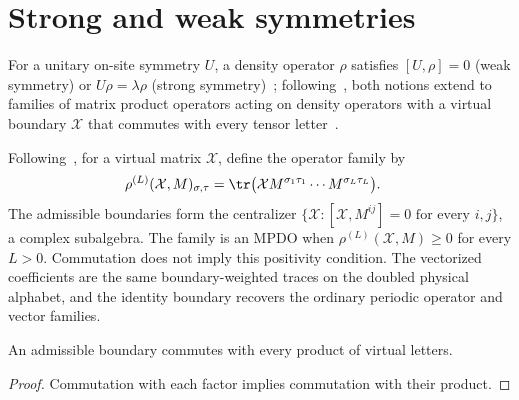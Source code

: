 \section{Strong and weak symmetries}

For a unitary on-site symmetry $U$, a density operator $\rho$ satisfies
$[U,\rho]=0$ (weak symmetry) or $U\rho=\lambda\rho$ (strong
symmetry)~\cite{deGroot2022SPTOpen,GarreRubio2026LocalCharacterization};
following~\cite{Sun2025Anomalous}, both notions extend to families of matrix
product operators acting on density operators with a virtual boundary
$\mathcal X$ that commutes with every tensor letter~\cite{Sun2025Anomalous}.

\begin{definition}
    \label{def:mpdo_commuting_boundary}
    \leanok
    Following~\cite[lines~175--182]{Sun2025Anomalous}, for a virtual matrix
    $\mathcal X$, define the operator family by
    \begin{align}
        \rho^{(L)}(\mathcal X,M)_{\sigma,\tau}
         & =\tr\bigl(\mathcal X M^{\sigma_1\tau_1}\cdots
        M^{\sigma_L\tau_L}\bigr).
        \label{eq:mpdo_boundary_operator}
    \end{align}
    The admissible boundaries form the centralizer
    $\{\mathcal X:[\mathcal X,M^{ij}]=0\text{ for every }i,j\}$,
    a complex subalgebra. The family is an MPDO when
    $\rho^{(L)}(\mathcal X,M)\ge0$ for every $L>0$.
    Commutation does not imply this positivity condition.
    The vectorized coefficients are the same boundary-weighted traces
    on the doubled physical alphabet, and the identity boundary recovers the
    ordinary periodic operator and vector families.
\end{definition}

\begin{lemma}
    \label{thm:mpdo_commuting_boundary_words}
    \leanok
    An admissible boundary commutes with every product of virtual letters.
\end{lemma}
\begin{proof}\leanok
    Commutation with each factor implies commutation with their product.
\end{proof}

